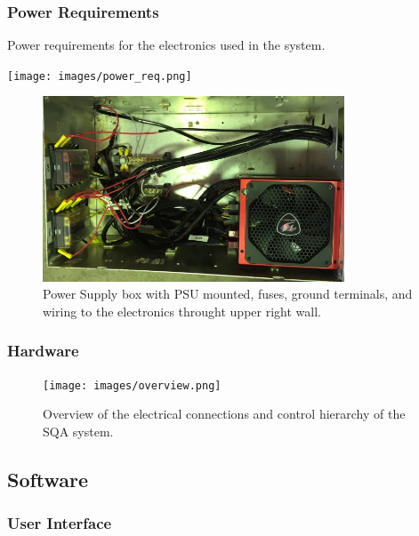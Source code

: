 \documentclass[fleqn,twoside]{article}
\begin{document}
\subsubsection{Power Requirements}


\begin{table}[h]%
	\caption{Power requirements for the electronics used in the system.}
	\centering
	\texttt{[image: images/power\_req.png]}
	\label{tab:power_req}
\end{table}



\begin{figure}[h]
	\centering
	\includegraphics[width=0.8\textwidth]{images/PSU2.jpg}
	\caption{Power Supply box with PSU mounted, fuses, ground terminals, and wiring to the electronics throught upper right wall.}
	\label{fig:PSU2}
\end{figure}




\subsubsection{Hardware}



\begin{figure}[h]
	\centering
	\texttt{[image: images/overview.png]}
	\caption{Overview of the electrical connections and control hierarchy of the SQA system.}
	\label{fig:overview}
\end{figure}  




\subsection{Software}



\subsubsection{User Interface}
\end{document}

